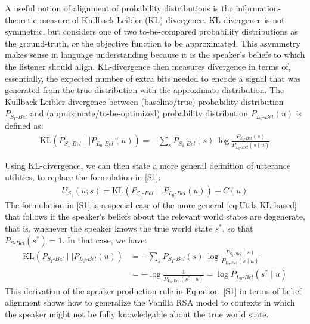 \documentclass{sp}
\begin{document}
A useful notion of alignment of probability distributions is the information-theoretic
measure of Kullback-Leibler (KL) divergence. KL-divergence is not symmetric, but considers one of
two to-be-compared probability distributions as the ground-truth, or the objective function
to be approximated.
This asymmetry makes sense in language understanding because it is the speaker's
beliefs to which the listener should align. KL-divergence then measures divergence in terms of,
essentially, the expected number of extra bits needed to encode a signal that was generated
from the true distribution with the approximate distribution.
The Kullback-Leibler divergence between (baseline/true) probability distribution
$P_{S_{1}\text{-}Bel}$ and (approximate/to-be-optimized) probability distribution
$P_{L_{0}\text{-}Bel}(u)$ is defined as:
\begin{align}
  \label{eq:KL-divergence}
  \text{KL}(P_{S_{1}\text{-}Bel} \mid \mid P_{L_{0}\text{-}Bel}(u)) = - \sum_{s} P_{S_{1}\text{-}Bel}(s) \ \log \frac{P_{S_{1}\text{-}Bel}(s)}{P_{L_{0}\text{-}Bel}(s \mid u)}
\end{align}

Using KL-divergence, we can then state a more general definition of utterance utilities, to
replace the formulation in \eqref{S1}:
\begin{align}
  \label{eq:Utils-KL-based}
  U_{S_1}(u; s) = \text{KL}(P_{S_{1}\text{-}Bel} \mid \mid P_{L_{0}\text{-}Bel}(u)) - C(u)
\end{align}
The formulation in \eqref{S1} is a special case of the more general \eqref{eq:Utils-KL-based}
that follows if the speaker's beliefs about the relevant world states are degenerate, that is,
whenever the speaker knows the true world state $s^{*}$, so that $P_{S\text{-}Bel}(s^{*})=1$.
In that case, we have:
\begin{align*}
  \text{KL}(P_{S_{1}\text{-}Bel} \mid \mid P_{L_{0}\text{-}Bel}(u)) & = - \sum_{s} P_{S_{1}\text{-}Bel}(s) \ \log \frac{P_{S_{1}\text{-}Bel}(s)}{P_{L_{0}\text{-}Bel}(s \mid u)} \\
  & =  - \log\frac{1}{P_{L_{0}\text{-}Bel}(s^* \mid u)} = \log P_{L_{0}\text{-}Bel}(s^* \mid u)
\end{align*}
This derivation of the speaker production rule in Equation~\eqref{S1} in terms of belief alignment shows how to generalize the Vanilla RSA model to contexts in which the speaker might not be fully knowledgable about the true world state. %
\end{document}
